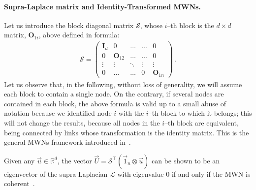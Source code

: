 \documentclass[aps,showpacs,preprintnumbers,amsmath,amssymb,twocolumn,superscriptaddress,floatfix,nofootinbib,10pt,pre]{revtex4-1}
\begin{document}


\paragraph*{Supra-Laplace matrix and Identity-Transformed MWNs.}

Let us introduce the block diagonal matrix $\mathcal{S}$, whose $i$--th block is the $d\times d$ matrix, $\mathbf{O}_{1i}$, above defined
in formula:
\begin{align}
\label{eq:matS}
\mathcal{S}=\left(
\begin{matrix}
 \mathbf{I}_d & 0 & \dots & \dots & 0\\
 0 & \mathbf{O}_{12} & \dots & \dots & 0\\
 \vdots & \vdots & \ddots & \vdots & \vdots\\
 0 & \dots & \dots & 0 & \mathbf{O}_{1n}
\end{matrix}\right)\, .
\end{align}
Let us observe that, in the following, without loss of generality, we will assume each block to contain a single node. On the contrary, if several nodes are contained in each block, the above formula is valid up to a small abuse of notation because we identified node $i$ with the $i$--th block to which it belongs; this will not change the results, because all nodes in the $i$--th block are equivalent, being connected by links whose transformation is the identity matrix. This is the general MWNs framework introduced in~\cite{tian2025matrix}.

Given any $\vec{u}\in\mathbb{R}^{d}$, the vector $\vec{U}=\mathcal{S}^\top(\vec{1}_n\otimes \vec{u})$ can be shown to be an eigenvector of the supra-Laplacian ${\mathcal{L}}$ with eigenvalue $0$ if and only if the MWN is coherent~\cite{tian2025matrix}. 
\end{document}
